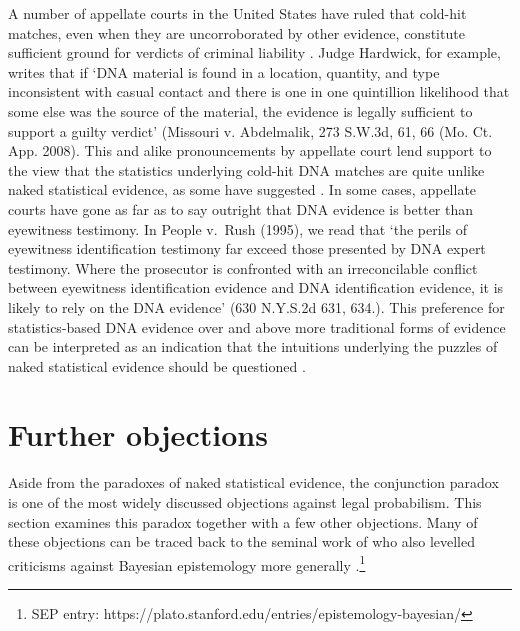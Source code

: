 \documentclass{article}
\begin{document}
 A number of appellate courts in the United States have ruled that cold-hit matches, even when they are uncorroborated by other evidence, constitute sufficient ground for verdicts of criminal liability \citep{malcom2008}. Judge Hardwick, for example, writes that if `DNA material is found in a location, quantity, and type inconsistent with casual contact and there is one in one quintillion likelihood that some else was the source of the material, the evidence is legally sufficient to support a guilty verdict' (Missouri v. Abdelmalik, 273 S.W.3d, 61, 66 (Mo. Ct. App. 2008). This and alike pronouncements by appellate court lend support to the view that the statistics underlying cold-hit DNA matches are quite unlike naked statistical evidence, as some  have suggested  \citep{chengeAdNunn2016,dibello2019TrialStatisticsHigh}. 
%
In some cases, appellate courts have gone as far as to say outright that DNA evidence is better than eyewitness testimony. In People v.\ Rush (1995), we read  that `the perils of eyewitness identification testimony far exceed those presented by DNA expert testimony. Where the prosecutor is confronted with an irreconcilable  conflict between eyewitness identification evidence and DNA identification evidence, it is likely to rely on the DNA evidence' (630 N.Y.S.2d 631, 634.). 
This preference for statistics-based DNA 
evidence over and above more traditional forms of evidence can be interpreted as an indication that the intuitions underlying the puzzles of naked statistical evidence should be questioned  \citep{ross2020}.





 
\section{Further objections}\label{sec:Further}


Aside from the paradoxes of naked statistical evidence, the conjunction paradox is one of the most widely discussed objections against legal probabilism. This section examines this paradox together with a few other objections. Many of these objections can be traced back to the seminal work of \citet{Cohen1977The-probable-an} who also levelled criticisms against Bayesian epistemology more generally \citep[for further discussion, see][]{earman1992bayes,bovens2004bayesian,bradley2015critical,Titelbaum2020Fundamentals-of}.\footnote{SEP entry: https://plato.stanford.edu/entries/epistemology-bayesian/}
\end{document}
